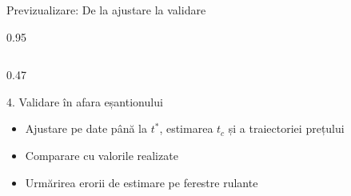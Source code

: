\documentclass[9pt, aspectratio=169, t]{beamer}
\begin{document}
\begin{frame}{Previzualizare: De la ajustare la validare}
\begin{cminipage}{0.95\textwidth}
{\begin{columns}[T]
\begin{column}{0.47\textwidth}
            \begin{block}{4. Validare în afara eșantionului}
                \begin{itemize}\setlength{\itemsep}{0pt}
                    \item Ajustare pe date până la $t^*$, estimarea $t_c$ și a traiectoriei prețului
                    \item Comparare cu valorile realizate
                    \item Urmărirea erorii de estimare pe ferestre rulante
                \end{itemize}
            \end{block}
        \end{column}
    \end{columns}
    }
    \end{cminipage}
\end{frame}
\end{document}
